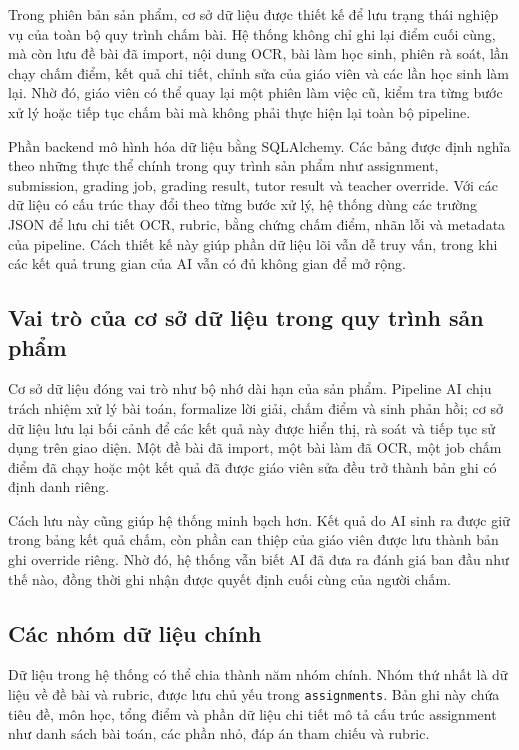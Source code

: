 \documentclass[12pt,a4paper]{article}
\begin{document}
Trong phiên bản sản phẩm, cơ sở dữ liệu được thiết kế để lưu trạng thái nghiệp
vụ của toàn bộ quy trình chấm bài. Hệ thống không chỉ ghi lại điểm cuối cùng, mà
còn lưu đề bài đã import, nội dung OCR, bài làm học sinh, phiên rà soát, lần
chạy chấm điểm, kết quả chi tiết, chỉnh sửa của giáo viên và các lần học sinh
làm lại. Nhờ đó, giáo viên có thể quay lại một phiên làm việc cũ, kiểm tra từng
bước xử lý hoặc tiếp tục chấm bài mà không phải thực hiện lại toàn bộ pipeline.

Phần backend mô hình hóa dữ liệu bằng SQLAlchemy. Các bảng được định nghĩa theo
những thực thể chính trong quy trình sản phẩm như assignment, submission, grading
job, grading result, tutor result và teacher override. Với các dữ liệu có cấu
trúc thay đổi theo từng bước xử lý, hệ thống dùng các trường JSON để lưu chi
tiết OCR, rubric, bằng chứng chấm điểm, nhãn lỗi và metadata của pipeline. Cách
thiết kế này giúp phần dữ liệu lõi vẫn dễ truy vấn, trong khi các kết quả trung
gian của AI vẫn có đủ không gian để mở rộng.

\subsection{Vai trò của cơ sở dữ liệu trong quy trình sản phẩm}

Cơ sở dữ liệu đóng vai trò như bộ nhớ dài hạn của sản phẩm. Pipeline AI chịu
trách nhiệm xử lý bài toán, formalize lời giải, chấm điểm và sinh phản hồi; cơ
sở dữ liệu lưu lại bối cảnh để các kết quả này được hiển thị, rà soát và tiếp
tục sử dụng trên giao diện. Một đề bài đã import, một bài làm đã OCR, một job
chấm điểm đã chạy hoặc một kết quả đã được giáo viên sửa đều trở thành bản ghi
có định danh riêng.

Cách lưu này cũng giúp hệ thống minh bạch hơn. Kết quả do AI sinh ra được giữ
trong bảng kết quả chấm, còn phần can thiệp của giáo viên được lưu thành bản ghi
override riêng. Nhờ đó, hệ thống vẫn biết AI đã đưa ra đánh giá ban đầu như thế
nào, đồng thời ghi nhận được quyết định cuối cùng của người chấm.

\subsection{Các nhóm dữ liệu chính}

Dữ liệu trong hệ thống có thể chia thành năm nhóm chính. Nhóm thứ nhất là dữ
liệu về đề bài và rubric, được lưu chủ yếu trong \texttt{assignments}. Bản ghi
này chứa tiêu đề, môn học, tổng điểm và phần dữ liệu chi tiết mô tả cấu trúc
assignment như danh sách bài toán, các phần nhỏ, đáp án tham chiếu và rubric.
\end{document}
